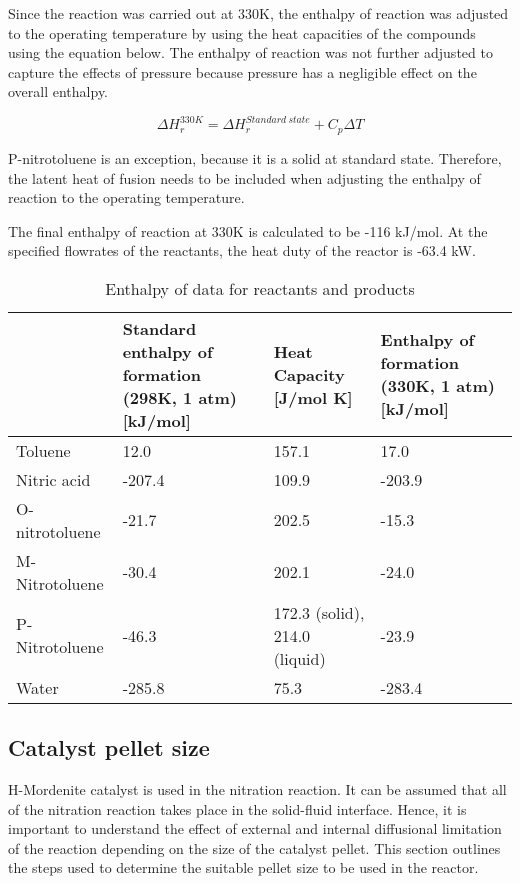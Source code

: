 Since the reaction was carried out at 330K, the enthalpy of reaction was adjusted to the operating temperature by using the heat capacities of the compounds using the equation below. The enthalpy of reaction was not further adjusted to capture the effects of pressure because pressure has a negligible effect on the overall enthalpy. 

\begin{equation}
  \Delta H_{r}^{330K} = \Delta H_{r}^{Standard \ state} + C_p \Delta T
\end{equation}

P-nitrotoluene is an exception, because it is a solid at standard state. Therefore, the latent heat of fusion needs to be included when adjusting the enthalpy of reaction to the operating temperature. 

The final enthalpy of reaction at 330K is calculated to be -116 kJ/mol. At the specified flowrates of the reactants, the heat duty of the reactor is -63.4 kW.

\begin{table}[H]
\centering
\caption{Enthalpy of data for reactants and products}
\label{tab:Heat enthalpy table}
\begin{tabularx}{\linewidth}{l|XXX}
\toprule
                                                                & Standard enthalpy of formation (298K, 1 atm) [kJ/mol] & Heat Capacity [J/mol K] & Enthalpy of formation (330K, 1 atm) [kJ/mol] \\ \midrule
Toluene                        & 12.0              & 157.1              & 17.0                     \\
Nitric acid                      & -207.4              & 109.9              & -203.9                       \\
O-nitrotoluene & -21.7             & 202.5              & -15.3              \\ 
M-Nitrotoluene                      & -30.4              & 202.1             & -24.0                       \\
P-Nitrotoluene                      & -46.3              & 172.3 (solid), 214.0 (liquid)             & -23.9                        \\
Water                     & -285.8              & 75.3              & -283.4                        \\
\bottomrule
\end{tabularx}
\end{table}
\subsection{Catalyst pellet size}
H-Mordenite catalyst is used in the nitration reaction. 
It can be assumed that all of the nitration reaction takes place in the solid-fluid interface. Hence, it is important to understand the effect of external and internal diffusional limitation of the reaction depending on the size of the catalyst pellet. This section outlines the steps used to determine the suitable pellet size to be used in the reactor.

